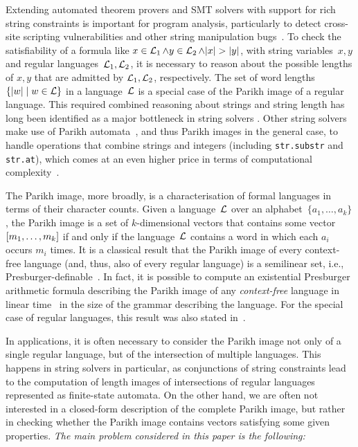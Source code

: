 Extending automated theorem provers and SMT solvers with support for rich string
constraints is important for program analysis, particularly to detect cross-site
scripting vulnerabilities and other string manipulation
bugs~\cite{DBLP:books/sp/BultanYAA17}.
%
To check the satisfiability of a formula like $x \in \operatorname{\mathcal{L}}_1 \wedge y \in \operatorname{\mathcal{L}}_2
\wedge |x| > |y|$, with string variables~$x, y$ and regular
languages~$\operatorname{\mathcal{L}}_1, \operatorname{\mathcal{L}}_2$, it is necessary to reason
about the possible lengths of $x, y$ that are admitted by
$\operatorname{\mathcal{L}}_1, \operatorname{\mathcal{L}}_2$, respectively. The
set of word lengths $\{ |w| \mid w \in \operatorname{\mathcal{L}}\}$ in a language~$\operatorname{\mathcal{L}}$
is a special case of the Parikh image of a regular language.
This required combined reasoning about
strings and string length has long been identified as a major bottleneck in
string solvers
\cite{DBLP:conf/cav/AbdullaACHRRS15,length-aware-solver,approximate-parikh,DBLP:journals/corr/BerzishZG17}.
Other string solvers make use of Parikh automata~\cite{parikh-automata}, and
thus Parikh images in the general case, to handle operations that combine
strings and integers (including
\verb!str.substr!  and \verb!str.at!), which comes at an even higher price in
terms of computational complexity~\cite{ostrich-plus}.

The Parikh image, more broadly, is a characterisation of formal
languages in terms of their character counts. Given a
language~$\operatorname{\mathcal{L}}$ over an alphabet~$\{a_1, \ldots, a_k\}$, the
Parikh image is a set of $k$-dimensional vectors that contains some
vector~$\left[{m_1, \ldots, m_k}\right]$ if and only if the
language~$\operatorname{\mathcal{L}}$ contains a word in which each $a_i$ occurs $m_i$
times. It is a classical result that the Parikh image of every
context-free language (and, thus, also of every regular language) is a
semilinear set, i.e., Presburger-definable~\cite{parikh-theorem}.
In
fact, it is possible to compute an existential Presburger arithmetic formula
describing the Parikh image of any \emph{context-free} language in
linear time~\cite{generate-parikh-image} in the size of the grammar
describing the language. For the special case of
regular languages, this result was also stated
in~\cite{muscholl-linear}.

In applications,  it is often necessary   
to consider the Parikh image not only of a single regular language, but of the
intersection of multiple languages.
This happens in string solvers in
particular, as conjunctions of string constraints lead to the computation of
length images of intersections of regular languages represented as
finite-state automata.
On the other hand, we are often
not interested in a closed-form description of the complete Parikh image,
but rather in checking whether the Parikh image contains vectors satisfying
some given properties. 
\emph{The main problem considered in this paper is the following:}

